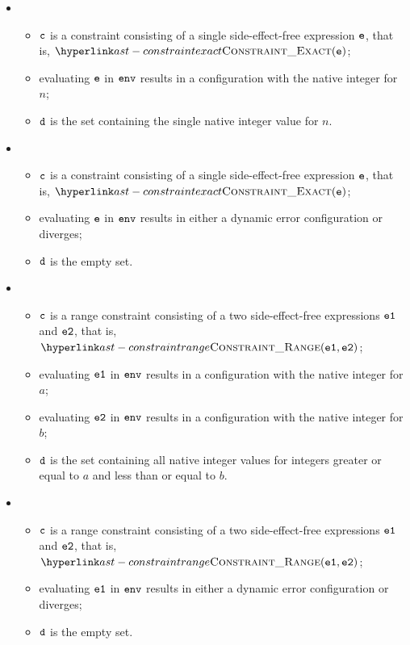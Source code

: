 \begin{itemize}
  \item {}
  \begin{itemize}
    \item $\texttt{c}$ is a constraint consisting of a single side-effect-free expression $\texttt{e}$, that is, $\ConstraintExact(\ve)$;
    \item evaluating $\texttt{e}$ in $\texttt{env}$ results in a configuration with the native integer for $n$;
    \item $\texttt{d}$ is the set containing the single native integer value for $n$.
  \end{itemize}

  \item {}
  \begin{itemize}
    \item $\texttt{c}$ is a constraint consisting of a single side-effect-free expression $\texttt{e}$, that is, $\ConstraintExact(\ve)$;
    \item evaluating $\texttt{e}$ in $\texttt{env}$ results in either a dynamic error configuration or diverges;
    \item $\texttt{d}$ is the empty set.
  \end{itemize}

  \item {}
  \begin{itemize}
    \item $\texttt{c}$ is a range constraint consisting of a two side-effect-free expressions $\texttt{e1}$ and $\texttt{e2}$, that is, $\ConstraintRange(\veone, \vetwo)$;
    \item evaluating $\texttt{e1}$ in $\texttt{env}$ results in a configuration with the native integer for $a$;
    \item evaluating $\texttt{e2}$ in $\texttt{env}$ results in a configuration with the native integer for $b$;
    \item $\texttt{d}$ is the set containing all native integer values for integers greater or equal to $a$ and less than or equal to $b$.
  \end{itemize}

  \item {}
  \begin{itemize}
    \item $\texttt{c}$ is a range constraint consisting of a two side-effect-free expressions $\texttt{e1}$ and $\texttt{e2}$, that is, $\ConstraintRange(\veone, \vetwo)$;
    \item evaluating $\texttt{e1}$ in $\texttt{env}$ results in either a dynamic error configuration or diverges;
    \item $\texttt{d}$ is the empty set.
  \end{itemize}


\end{itemize}
